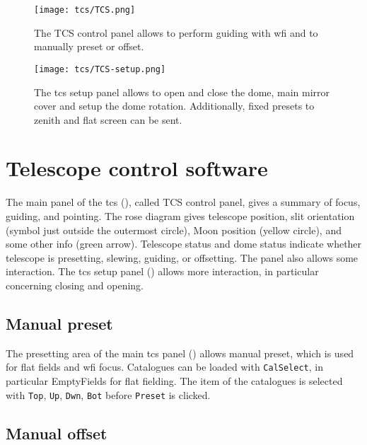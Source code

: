 \documentclass[11pt,fleqn,a4paper]{book}
\begin{document}
\begin{figure}[!ht]
\centering
\texttt{[image: tcs/TCS.png]}
\caption[Main panel of the telescope control software]{The \gls{TCS control panel} allows to perform guiding with \gls{wfi} and to manually preset or offset.}
\label{fig:tcs}
\end{figure}

\begin{figure}[!ht]
\centering
\texttt{[image: tcs/TCS-setup.png]}
\caption[Setup panel of the telescope control software]{The \gls{tcs} setup panel allows to open and close the \gls{dome}, main
mirror cover and setup the \gls{dome} rotation.  Additionally, fixed presets
to zenith and flat screen can be sent.}
\label{fig:tcssetup}
\end{figure}

\section{Telescope control software}

The main panel of the \gls{tcs} (), called \gls{TCS control panel}, gives a summary of \gls{focus},
guiding, and \gls{pointing}. The \gls{rose diagram} gives telescope position, \gls{slit}
orientation (symbol just outside the outermost circle), Moon position (yellow
circle), and some other info (green arrow). Telescope status and \gls{dome} status
indicate whether telescope is \gls{preset}ting, slewing, guiding, or offsetting.  The
panel also allows some interaction.  The \gls{tcs} setup panel
() allows more interaction, in particular concerning
closing and opening.

\subsection{Manual preset}  
\label{manualpreset}


The \gls{preset}ting area  of the main \gls{tcs} panel () allows manual
preset, which is used for flat fields and \gls{wfi} \gls{focus}.  Catalogues can be loaded
with \texttt{CalSelect}, in particular EmptyFields for flat fielding. The item
of the catalogues is selected with \texttt{Top}, \texttt{Up}, \texttt{Dwn},
\texttt{Bot} before \texttt{Preset} is clicked.

\subsection{Manual offset}
\label{manualoffset}
\end{document}

